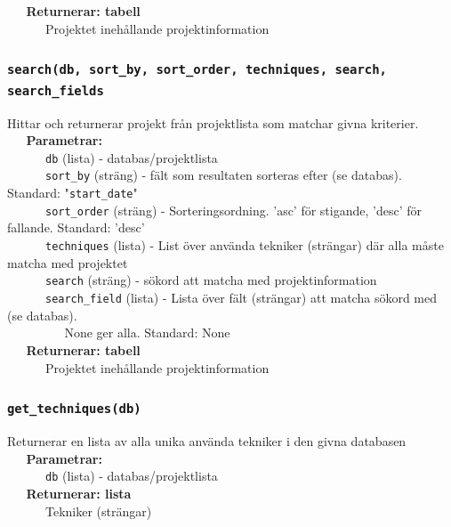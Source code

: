 \documentclass{TDP003mall}
\begin{document}
\verb|   |\textbf{Returnerar: tabell}\\
\verb|   |\verb|   |Projektet inehållande projektinformation

\subsubsection{\texttt{search(db, sort\_by, sort\_order, techniques, search, search\_fields}}
Hittar och returnerar projekt från projektlista som matchar givna kriterier.\\

\verb|   |\textbf{Parametrar:}\\
\verb|   |\verb|   |\verb|db| (lista) - databas/projektlista\\
\verb|   |\verb|   |\verb|sort_by| (sträng) - fält som resultaten sorteras efter (se databas). Standard: "\verb|start_date|"\\
\verb|   |\verb|   |\verb|sort_order| (sträng) - Sorteringsordning. 'asc' för stigande, 'desc' för fallande. Standard: 'desc'\\
\verb|   |\verb|   |\verb|techniques| (lista) - List över använda tekniker (strängar) där alla måste matcha med projektet\\
\verb|   |\verb|   |\verb|search| (sträng) - sökord att matcha med projektinformation\\
\verb|   |\verb|   |\verb|search_field| (lista) - Lista över fält (strängar) att matcha sökord med (se databas).\\\verb|   |\verb|   |\verb|   |None ger alla. Standard: None\\

\verb|   |\textbf{Returnerar: tabell}\\
\verb|   |\verb|   |Projektet inehållande projektinformation


\subsubsection{\texttt{get\_techniques(db)}}
Returnerar en lista av alla unika använda tekniker i den givna databasen\\

\verb|   |\textbf{Parametrar:}\\
\verb|   |\verb|   |\verb|db| (lista) - databas/projektlista\\

\verb|   |\textbf{Returnerar: lista}\\
\verb|   |\verb|   |Tekniker (strängar)
\end{document}
